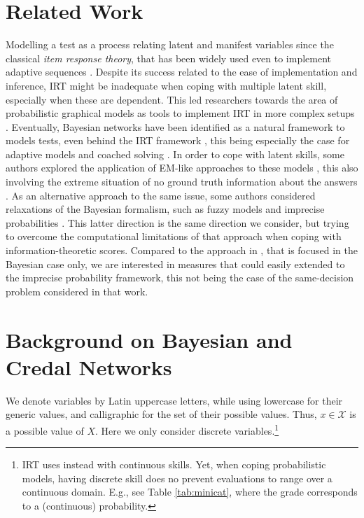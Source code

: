 \documentclass[runningheads]{llncs}
\begin{document}
\section{Related Work}\label{sec:work}
Modelling a test as a process relating latent and manifest variables since the classical \emph{item response theory}, that has been widely used even to implement adaptive sequences \cite{embretson2013item}. Despite its success related to the ease of implementation and inference, IRT might be inadequate when coping with multiple latent skill, especially when these are dependent. This led researchers towards the area of probabilistic graphical models as tools to implement IRT in more complex setups \cite{mislevy1997graphical}. Eventually, Bayesian networks have been identified as a natural framework to models tests, even behind the IRT framework \cite{vomlel2004bayesian}, this being especially the case for adaptive models \cite{vomlel2004building} and coached solving \cite{conati1997line}. In order to cope with latent skills, some authors explored the application of EM-like approaches to these models \cite{plajner2020monotonicity}, this also involving the extreme situation of no ground truth information about the answers \cite{bachrach2012grade}.
As an alternative approach to the same issue, some authors considered relaxations of the Bayesian formalism, such as fuzzy models \cite{badaracco2013fuzzy} and imprecise probabilities \cite{mangili2017b}. This latter direction is the same direction we consider, but trying to overcome the computational limitations of that approach when coping with information-theoretic scores. Compared to the approach in \cite{chen2015computer}, that is focused in the Bayesian case only, we are interested in measures that could easily extended to the imprecise probability framework, this not being the case of the same-decision problem considered in that work.

\section{Background on Bayesian and Credal Networks}\label{sec:background}
We denote variables by Latin uppercase letters, while using lowercase for their generic values, and calligraphic for the set of their possible values. Thus, $x \in \mathcal{X}$ is a possible value of $X$. Here we only consider discrete variables.\footnote{IRT uses instead with continuous skills. Yet, when coping probabilistic models, having discrete skill does no prevent evaluations to range over a continuous domain. E.g., see Table \ref{tab:minicat}, where the grade corresponds to a (continuous) probability.}
\end{document}
